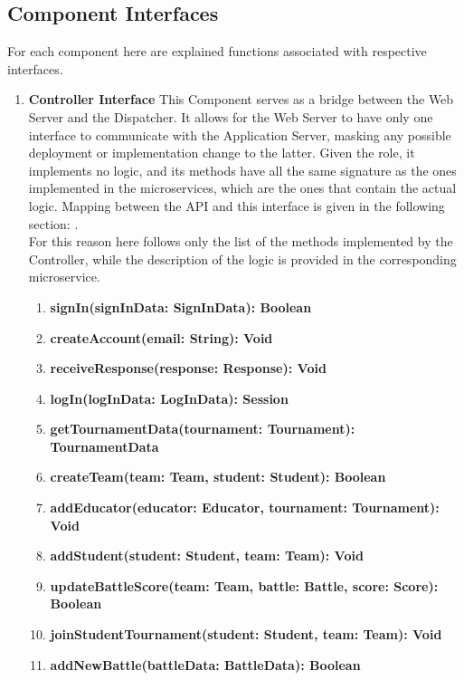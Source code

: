 \subsection{Component Interfaces}
For each component here are explained functions associated with respective interfaces.
\begin{enumerate}
    \item \textbf{Controller Interface}
    This Component serves as a bridge between the Web Server and the Dispatcher. It allows for the Web Server to have only one interface to communicate with the Application Server, masking any possible deployment or implementation change to the latter.
    Given the role, it implements no logic, and its methods have all the same signature as the ones implemented in the microservices, which are the ones that contain the actual logic. 
    Mapping between the API and this interface is given in the following section: .\\
    For this reason here follows only the list of the methods implemented by the Controller, while the description of the logic is provided in the corresponding microservice.
            \begin{enumerate}[label=$\bullet$]
                \item \textbf{signIn(signInData: SignInData): Boolean}
                \item \textbf{createAccount(email: String): Void}
                \item \textbf{receiveResponse(response: Response): Void}
                \item \textbf{logIn(logInData: LogInData): Session}
                \item \textbf{getTournamentData(tournament: Tournament): TournamentData}
                \item \textbf{createTeam(team: Team, student: Student): Boolean}
                \item \textbf{addEducator(educator: Educator, tournament: Tournament): Void}
                \item \textbf{addStudent(student: Student, team: Team): Void}
                \item \textbf{updateBattleScore(team: Team, battle: Battle, score: Score): Boolean}
                \item \textbf{joinStudentTournament(student: Student, team: Team): Void}
                \item \textbf{addNewBattle(battleData: BattleData): Boolean}

\end{enumerate}
\end{enumerate}

